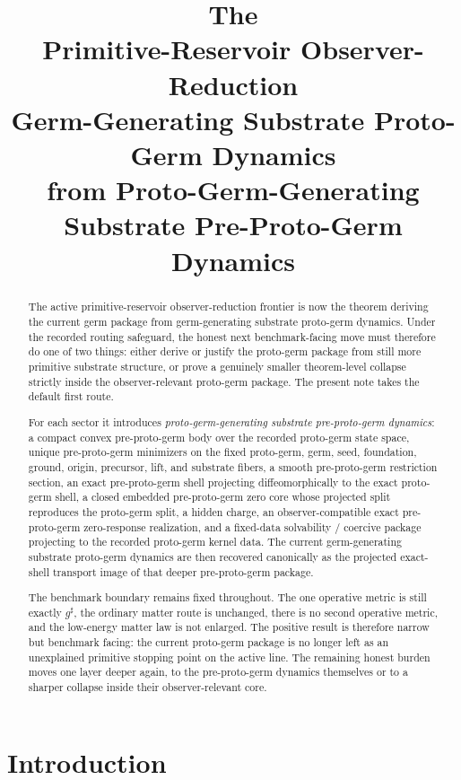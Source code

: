 \documentclass[11pt]{article}
\title{\textbf{The \TheoryName{}}\\[0.4em]
\large Primitive-Reservoir Observer-Reduction\\
\large Germ-Generating Substrate Proto-Germ Dynamics\\
\large from Proto-Germ-Generating Substrate Pre-Proto-Germ Dynamics}
\author{}
\date{}
\newcommand{\CompletedMetric}{g^{\sharp}}
\begin{document}
\maketitle

\begin{abstract}
The active primitive-reservoir observer-reduction frontier is now the theorem deriving the current germ package from germ-generating substrate proto-germ dynamics. Under the recorded routing safeguard, the honest next benchmark-facing move must therefore do one of two things: either derive or justify the proto-germ package from still more primitive substrate structure, or prove a genuinely smaller theorem-level collapse strictly inside the observer-relevant proto-germ package. The present note takes the default first route.

For each sector it introduces \emph{proto-germ-generating substrate pre-proto-germ dynamics}: a compact convex pre-proto-germ body over the recorded proto-germ state space, unique pre-proto-germ minimizers on the fixed proto-germ, germ, seed, foundation, ground, origin, precursor, lift, and substrate fibers, a smooth pre-proto-germ restriction section, an exact pre-proto-germ shell projecting diffeomorphically to the exact proto-germ shell, a closed embedded pre-proto-germ zero core whose projected split reproduces the proto-germ split, a hidden charge, an observer-compatible exact pre-proto-germ zero-response realization, and a fixed-data solvability / coercive package projecting to the recorded proto-germ kernel data. The current germ-generating substrate proto-germ dynamics are then recovered canonically as the projected exact-shell transport image of that deeper pre-proto-germ package.

The benchmark boundary remains fixed throughout. The one operative metric is still exactly \(\CompletedMetric\), the ordinary matter route is unchanged, there is no second operative metric, and the low-energy matter law is not enlarged. The positive result is therefore narrow but benchmark facing: the current proto-germ package is no longer left as an unexplained primitive stopping point on the active line. The remaining honest burden moves one layer deeper again, to the pre-proto-germ dynamics themselves or to a sharper collapse inside their observer-relevant core.
\end{abstract}

\section{Introduction}
\end{document}
